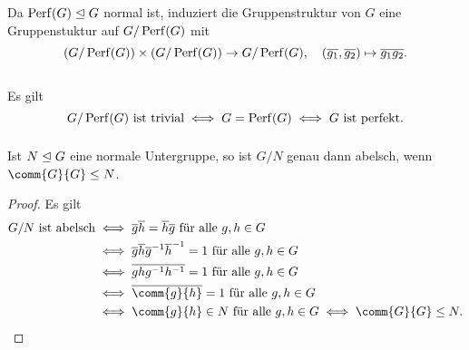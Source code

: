 \subsection{}

Da $\operatorname{Perf}(G) \trianglelefteq G$ normal ist, induziert die Gruppenstruktur von $G$ eine Gruppenstuktur auf $G/\operatorname{Perf}(G)$ mit
\[
          (G/\operatorname{Perf}(G)) \times (G/\operatorname{Perf}(G))
  \to     G/\operatorname{Perf}(G),
  \quad   (\overline{g_1}, \overline{g_2})
  \mapsto \overline{g_1 g_2}.
\]





\subsection{}



\subsubsection{}

Es gilt
\[
        \text{$G/\operatorname{Perf}(G)$ ist trivial}
  \iff  G = \operatorname{Perf}(G)
  \iff  \text{$G$ ist perfekt}.
\]



\subsubsection{}

\begin{lemma}
  Ist $N \trianglelefteq G$ eine normale Untergruppe, so ist $G/N$ genau dann abelsch, wenn $\comm{G}{G} \subgroup N$.
\end{lemma}

\begin{proof}
  Es gilt
  \begin{align*}
          \text{$G/N$ ist abelsch}
    &\iff \text{$\class{g} \class{h} = \class{h} \class{g}$ für alle $g, h \in G$}
    \\
    &\iff \text{$\class{g} \class{h} \class{g}^{-1} \class{h}^{-1} = 1$ für alle $g, h \in G$}
    \\
    &\iff \text{$\class{g h g^{-1} h^{-1}} = 1$ für alle $g, h \in G$}
    \\
    &\iff \text{$\class{\comm{g}{h}} = 1$ für alle $g, h \in G$}
    \\
    &\iff \text{$\comm{g}{h} \in N$ für alle $g, h \in G$}
     \iff \comm{G}{G} \subgroup N.
  \qedhere
  \end{align*}
\end{proof}


